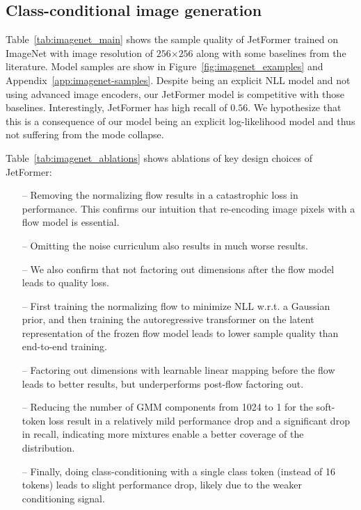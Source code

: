 \documentclass{article} %
\newcommand{\name}{JetFormer\xspace}
\begin{document}
\subsection{Class-conditional image generation} \label{sec:imagenet_gen}

\begin{table}[t]\vspace{-0.2cm}
    \caption{Summary of the main \name (trained for 100 epochs) ablations performed on class-conditional ImageNet256 generation. We demonstrate relative importance of various components and highlight the interesting interplay between PCA preprocessing and the noise curriculum.}
    \centering
    
    \label{tab:imagenet_ablations}
    \vspace{-0.2cm}
\end{table}

Table~\ref{tab:imagenet_main} shows the sample quality of \name trained on ImageNet with image resolution of $256$$\times$$256$ along with some baselines from the literature.
Model samples are show in Figure~\ref{fig:imagenet_examples} and Appendix~\ref{app:imagenet-samples}.
Despite being an explicit NLL model and not using advanced image encoders, our \name model is competitive with those baselines. Interestingly, \name has high recall of $0.56$. We hypothesize that this is a consequence of our model being an explicit log-likelihood model and thus not suffering from the mode collapse.

Table~\ref{tab:imagenet_ablations} shows ablations of key design choices of JetFormer:
\begin{itemize}
\setlength\itemsep{0pt}
    \item[--] Removing the normalizing flow results in a catastrophic loss in performance. This confirms our intuition that re-encoding image pixels with a flow model is essential.
    \item[--] Omitting the noise curriculum also results in much worse results.
    \item[--] We also confirm that not factoring out dimensions after the flow model leads to quality loss.
    \item[--] First training the normalizing flow to minimize NLL w.r.t. a Gaussian prior, and then training the autoregressive transformer on the latent representation of the frozen flow model leads to lower sample quality than end-to-end training.
    \item[--] Factoring out dimensions with learnable linear mapping before the flow leads to better results, but underperforms post-flow factoring out.
    \item[--] Reducing the number of GMM components from 1024 to 1 for the soft-token loss result in a relatively mild performance drop and a significant drop in recall, indicating more mixtures enable a better coverage of the distribution.
    \item[--] Finally, doing class-conditioning with a single class token (instead of 16 tokens) leads to slight performance drop, likely due to the weaker conditioning signal.
\end{itemize}
\end{document}
